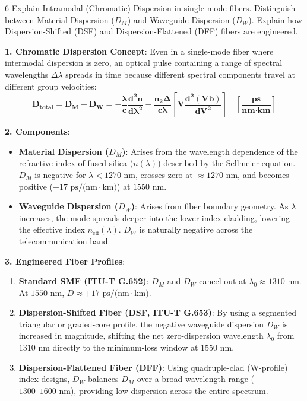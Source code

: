\begin{theoryq}{6}
Explain Intramodal (Chromatic) Dispersion in single-mode fibers. Distinguish between Material Dispersion ($D_M$) and Waveguide Dispersion ($D_W$). Explain how Dispersion-Shifted (DSF) and Dispersion-Flattened (DFF) fibers are engineered.
\end{theoryq}
\begin{theorysol}
\textbf{1. Chromatic Dispersion Concept}:
Even in a single-mode fiber where intermodal dispersion is zero, an optical pulse containing a range of spectral wavelengths $\Delta\lambda$ spreads in time because different spectral components travel at different group velocities:
\begin{equation}
\mathbf{D_{\text{total}} = D_M + D_W = -\frac{\lambda}{c}\frac{d^2 n}{d\lambda^2} - \frac{n_2 \Delta}{c \lambda}\left[ V \frac{d^2(V b)}{dV^2} \right] \quad \left[\frac{\text{ps}}{\text{nm}\cdot\text{km}}\right]}
\end{equation}

\textbf{2. Components}:
\begin{itemize}
    \item \textbf{Material Dispersion ($D_M$)}: Arises from the wavelength dependence of the refractive index of fused silica ($n(\lambda)$) described by the Sellmeier equation. $D_M$ is negative for $\lambda < 1270\text{ nm}$, crosses zero at $\approx 1270\text{ nm}$, and becomes positive ($+17\text{ ps/(nm}\cdot\text{km)}$) at $1550\text{ nm}$.
    \item \textbf{Waveguide Dispersion ($D_W$)}: Arises from fiber boundary geometry. As $\lambda$ increases, the mode spreads deeper into the lower-index cladding, lowering the effective index $n_{\text{eff}}(\lambda)$. $D_W$ is naturally negative across the telecommunication band.
\end{itemize}

\textbf{3. Engineered Fiber Profiles}:
\begin{enumerate}
    \item \textbf{Standard SMF (ITU-T G.652)}:
    $D_M$ and $D_W$ cancel out at \textbf{$\lambda_0 \approx 1310\text{ nm}$}. At $1550\text{ nm}$, $D \approx +17\text{ ps/(nm}\cdot\text{km)}$.
    \item \textbf{Dispersion-Shifted Fiber (DSF, ITU-T G.653)}:
    By using a segmented triangular or graded-core profile, the negative waveguide dispersion $D_W$ is increased in magnitude, shifting the net zero-dispersion wavelength $\lambda_0$ from $1310\text{ nm}$ directly to the minimum-loss window at \textbf{$1550\text{ nm}$}.
    \item \textbf{Dispersion-Flattened Fiber (DFF)}:
    Using quadruple-clad (W-profile) index designs, $D_W$ balances $D_M$ over a broad wavelength range ($1300\text{--}1600\text{ nm}$), providing low dispersion across the entire spectrum.
\end{enumerate}
\end{theorysol}
\vspace{4mm}

